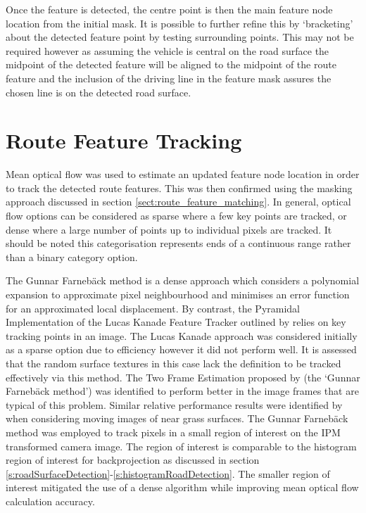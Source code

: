 \documentclass[]{aiaa-tc}%
\begin{document}
Once the feature is detected, the centre point is then the main feature node location from the initial mask. It is possible to further refine this by `bracketing' about the detected feature point by testing surrounding points. This may not be required however as assuming the vehicle is central on the road surface the midpoint of the detected feature will be aligned to the midpoint of the route feature and the inclusion of the driving line in the feature mask assures the chosen line is on the detected road surface.

\section{Route Feature Tracking}\label{s:roadFeatureTracking}

Mean optical flow was used to estimate an updated feature node location in order to track the detected route features. This was then confirmed using the masking approach discussed in section \ref{sect:route_feature_matching}. In general, optical flow options can be considered as sparse where a few key points are tracked, or dense where a large number of points up to individual pixels are tracked. It should be noted this categorisation represents ends of a continuous range rather than a binary category option. 

The Gunnar Farneb{\"a}ck method \citep{opticalFlowSolution} is a dense approach which considers a polynomial expansion to approximate pixel neighbourhood and minimises an error function for an approximated local displacement. By contrast, the Pyramidal Implementation of the Lucas Kanade Feature Tracker outlined by \citet{opticalFlowLKPyramidal} relies on key tracking points in an image. The Lucas Kanade approach was considered initially as a sparse option due to efficiency however it did not perform well. It is assessed that the random surface textures in this case lack the definition to be tracked effectively via this method. The Two Frame Estimation proposed by \citet{opticalFlowSolution} (the `Gunnar Farneb{\"a}ck method') was identified to perform better in the image frames that are typical of this problem. Similar relative performance results were identified by \citet{opticalFlowLKvsDenseUAV} when considering moving images of near grass surfaces. The Gunnar Farneb{\"a}ck method was employed to track pixels in a small region of interest on the IPM transformed camera image. The region of interest is comparable to the histogram region of interest for backprojection as discussed in section \ref{s:roadSurfaceDetection}-\ref{s:histogramRoadDetection}. The smaller region of interest mitigated the use of a dense algorithm while improving mean optical flow calculation accuracy.
\end{document}
